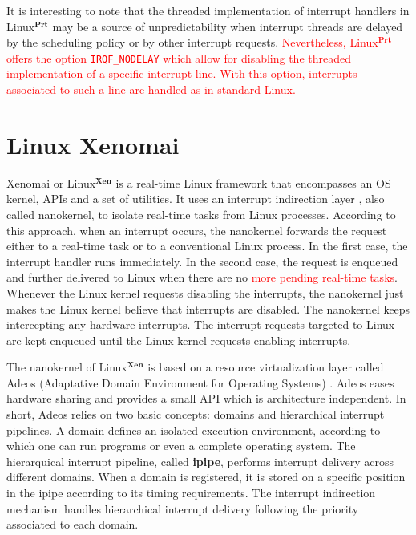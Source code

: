 \documentclass{acm_proc_article-sp}
\newcommand{\col}[1]{\textcolor{red}{#1}}
\newcommand{\cod}[1]{\hspace{0.1cm}\texttt{#1}}
\begin{document}
It is interesting to note that the threaded implementation of interrupt handlers in
Linux$^{\mathbf{Prt}}$ may be a source of unpredictability when interrupt threads
are delayed by the scheduling policy or by other interrupt requests. \col{Nevertheless,
Linux$^{\mathbf{Prt}}$ offers the option \cod{IRQF\_NODELAY} which allow for
disabling the threaded implementation of a specific interrupt line. With this option,
interrupts associated to such a line are handled as in standard Linux.}
\newline

\section{Linux Xenomai}
\label{sec:xenomai}

Xenomai or Linux$^{\mathbf{Xen}}$ is a real-time Linux framework that encompasses an
OS kernel, APIs and a set of utilities. It uses an interrupt indirection layer
\cite{Stodolsky93}, also called nanokernel, to isolate real-time tasks from Linux
processes. According to this approach, when an interrupt occurs, the nanokernel
forwards the request either to a real-time task or to a conventional Linux
process. In the first case, the interrupt handler runs immediately. In the second
case, the request is enqueued and further delivered to Linux when there are no
\col{more pending real-time tasks}. Whenever the Linux kernel requests disabling the
interrupts, the nanokernel just makes the Linux kernel believe that interrupts are
disabled. The nanokernel keeps intercepting any hardware interrupts.  The interrupt
requests targeted to Linux are kept enqueued until the Linux kernel requests
enabling interrupts.

The nanokernel of Linux$^{\mathbf{Xen}}$ is based on a resource virtualization layer
called Adeos (Adaptative Domain Environment for Operating Systems)
\cite{Yaghmour01}. Adeos eases hardware sharing and provides a small API which is
architecture independent. In short, Adeos relies on two basic concepts: domains and
hierarchical interrupt pipelines. A domain defines an isolated execution
environment, according to which one can run programs or even a complete operating
system. The hierarquical interrupt pipeline, called \textbf{ipipe}, performs
interrupt delivery across different domains. When a domain is registered, it is
stored on a specific position in the ipipe according to its timing requirements. The
interrupt indirection mechanism handles hierarchical interrupt delivery following
the priority associated to each domain.
\end{document}
